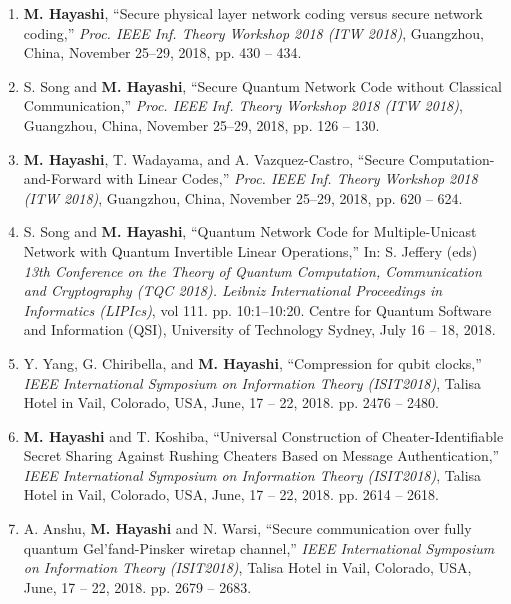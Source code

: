 \documentclass[a4paper,12pt,oneside]{article}
\begin{document}
\begin{enumerate}
    \item
    \textbf{M. Hayashi}, 
    ``Secure physical layer network coding versus secure network coding,''
    {\em Proc. IEEE Inf. Theory Workshop 2018 (ITW 2018)}, 
    Guangzhou, China, November 25--29, 2018, pp. 430 -- 434. 
    
    \item
    S. Song and \textbf{M. Hayashi}, 
    ``Secure Quantum Network Code without Classical Communication,''
    {\em Proc. IEEE Inf. Theory Workshop 2018 (ITW 2018)}, 
    Guangzhou, China, November 25--29, 2018, pp. 126 -- 130. 
    
    \item
    \textbf{M. Hayashi}, T. Wadayama, and A. Vazquez-Castro,
    ``Secure Computation-and-Forward with Linear Codes,''
    {\em Proc. IEEE Inf. Theory Workshop 2018 (ITW 2018)}, 
    Guangzhou, China, November 25--29, 2018, pp. 620 -- 624. 
    
    \item
    S. Song and \textbf{M. Hayashi}, 
    ``Quantum Network Code for Multiple-Unicast Network with Quantum Invertible Linear Operations,''
    In: S. Jeffery (eds) 
    {\em 13th Conference on the Theory of Quantum Computation, Communication and Cryptography (TQC 2018). Leibniz International Proceedings in Informatics (LIPIcs)},
     vol 111. pp. 10:1--10:20.
    Centre for Quantum Software and Information (QSI), University of Technology Sydney, 
    July 16 -- 18, 2018.
    
    \item
    Y. Yang, G. Chiribella, and \textbf{M. Hayashi},
    ``Compression for qubit clocks,''
    {\em IEEE International Symposium on Information Theory (ISIT2018)}, 
    Talisa Hotel in Vail, Colorado, USA, June, 17 -- 22, 2018.
    pp. 2476 -- 2480.
    
    \item
     \textbf{M. Hayashi} and T. Koshiba,
    ``Universal Construction of Cheater-Identifiable Secret Sharing Against Rushing Cheaters Based on Message Authentication,''
    {\em IEEE International Symposium on Information Theory (ISIT2018)}, 
     Talisa Hotel in Vail, Colorado, USA, June, 17 -- 22, 2018.
    pp. 2614 -- 2618.
    
    \item
    A. Anshu, \textbf{M. Hayashi} and N. Warsi,
    ``Secure communication over fully quantum Gel'fand-Pinsker wiretap channel,''
    {\em IEEE International Symposium on Information Theory (ISIT2018)}, 
     Talisa Hotel in Vail, Colorado, USA, June, 17 -- 22, 2018.
    pp. 2679 -- 2683. 
    

\end{enumerate}
\end{document}
